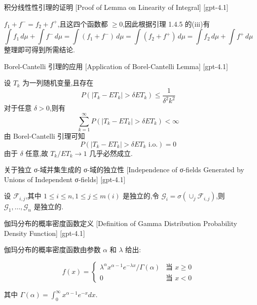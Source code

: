 \documentclass[UTF8]{ctexart}
\begin{document}
    
    
    \begin{prf}
        {积分线性性引理的证明}
        [Proof of Lemma on Linearity of Integral]
        [gpt-4.1]
        
$f_1 + f^- = f_2 + f^+$,且这四个函数都 $\geq 0$,因此根据引理 1.4.5 的(iii)有
\[
\int f_1 \, d\mu + \int f^- \, d\mu = \int (f_1 + f^-) \, d\mu = \int (f_2 + f^+) \, d\mu = \int f_2 \, d\mu + \int f^+ \, d\mu
\]
整理即可得到所需结论.

    \end{prf}
    
    
    
    \begin{thm}
        {Borel-Cantelli 引理的应用}
        [Application of Borel-Cantelli Lemma]
        [gpt-4.1]
        
设 $T_k$ 为一列随机变量,且存在
\[
P ( | T _ { k } - E T _ { k } | > \delta E T _ { k } ) \leq \frac{1}{\delta^2 k^2}
\]
对于任意 $\delta > 0$,则有
\[
\sum_{k=1}^{\infty} P( | T_k - E T_k | > \delta E T_k ) < \infty
\]
由 Borel-Cantelli 引理可知
\[
P( | T_k - E T_k | > \delta E T_k \text{ i.o.} ) = 0
\]
由于 $\delta$ 任意,故 $T_k / E T_k \to 1$ 几乎必然成立.

    \end{thm}
    
    
    
    \begin{thm}
        {关于独立 σ-域并集生成的 σ-域的独立性}
        [Independence of σ-fields Generated by Unions of Independent σ-fields]
        [gpt-4.1]
        
设 $\mathcal{F}_{i, j}$,其中 $1 \leq i \leq n, 1 \leq j \leq m(i)$ 是独立的,令 $\mathcal{G}_i = \sigma\left(\cup_{j} \mathcal{F}_{i, j}\right)$,则 $\mathcal{G}_1, \ldots, \mathcal{G}_n$ 是独立的.

    \end{thm}
    
    
    
    \begin{dfn}
        {伽玛分布的概率密度函数定义}
        [Definition of Gamma Distribution Probability Density Function]
        [gpt-4.1]
        
伽玛分布的概率密度函数由参数 $\alpha$ 和 $\lambda$ 给出:

\[
f(x) =
\begin{cases}
\lambda^{\alpha} x^{\alpha - 1} e^{-\lambda x} / \Gamma(\alpha) & \text{当 } x \geq 0 \\
0 & \text{当 } x < 0
\end{cases}
\]

其中 $\Gamma(\alpha) = \int_{0}^{\infty} x^{\alpha - 1} e^{-x} dx$.

    \end{dfn}
    
\end{document}
